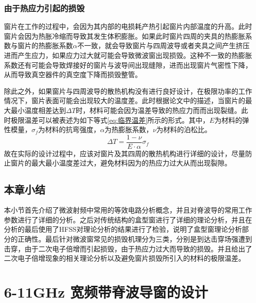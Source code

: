 \documentclass[master]{thesis-uestc}
\begin{document}
\subsection{由于热应力引起的损毁}
窗片在工作的过程中，会因为其内部的电损耗产热引起窗片内部温度的升高。此时窗片会因为热胀冷缩而导致其发生体积膨胀。如果此时窗片四周的夹具的热膨胀系数与窗片的热膨胀系数\(\alpha\)不一致，就会导致窗片与四周波导或者夹具之间产生挤压进而产生应力，如果应力过大就可能会导致微波窗出现损毁。这种不一致的热膨胀系数还有可能会导致焊接好的窗片与波导间出现缝隙，进而出现窗片气密性下降，从而导致真空器件的真空度下降而损毁整管。

除此之外，如果窗片与四周波导的散热机构没有进行良好设计，在极限功率的工作情况下，窗片表面可能会出现较大的温度差。此时根据论文\cite{lishengming_window_2017}中的描述，当窗片的最大最小温度相差达到\(\Delta T\)时，材料可能会因为温差导致的热应力而而出现裂缝。此时极限温差可以被表述为如下等式\ref{eq:临界温差}所示的形式。其中，\(E\)为材料的弹性模量，\(\sigma_f\)为材料的抗弯强度，\(\alpha\)为热膨胀系数，\(\nu\)为材料的泊松比。
\begin{equation}\label{eq:临界温差}
    \Delta T = \frac{1 - \nu}{E \cdot \alpha} \sigma_f
\end{equation}
故在实际的设计过程中，应该对窗片及其四周的散热机构进行详细的设计，尽量防止窗片的最大最小温度差过大，避免材料因为的热应力过大从而出现裂隙。

\section{本章小结}
本小节首先介绍了微波射频中常用的等效电路分析概念，并且对脊波导的常用工作参数进行了详细的分析。之后对传统结构的盒型窗进行了详细的理论分析，并且在分析的最后使用了HFSS对理论分析的结果进行了检验，说明了盒型窗理论分析部分的正确性。最后针对微波窗常见的损毁机理分为三类，分别是到达击穿场强遭到击穿，由于二次电子倍增而引起损毁，由于热应力过大而导致的损毁。并且给出了二次电子倍增现象的相关理论分析以及避免窗片损毁所引入的材料的极限温差。

\chapter{6-11GHz 宽频带脊波导窗的设计}
\end{document}
